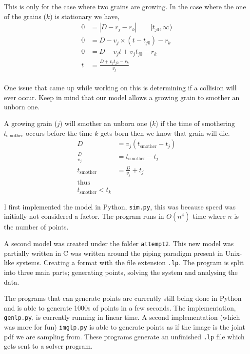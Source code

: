 \documentclass{article}
\begin{document}
This is only for the case where two grains are growing. In the case where the
one of the grains ($k$) is stationary we have,
\begin{align*}
    0 &= |D - r_j - r_k| \qquad [t_{j0}, \infty) \\
    0 &= D - v_j \times (t - t_{j0}) - r_k \\
    0 &= D - v_j t + v_j t_{j0} - r_k \\
    t &= \frac{D + v_j t_{j0} - r_k}{v_j} \\
\end{align*}

One issue that came up while working on this is determining if a collision will
ever occur. Keep in mind that our model allows a growing grain to smother an
unborn one.

A growing grain ($j$) will smother an unborn one ($k$) if the time of
smothering $t_{\text{smother}}$ occurs before the time $k$ gets born
then we know that grain will die.
\begin{align*}
    D &= v_j (t_{\text{smother}} - t_j) \\
    \frac{D}{v_j} &= t_{\text{smother}} - t_j \\
    t_{\text{smother}} &= \frac{D}{v_j} + t_j \\
    \text{thus} \\
    t_{\text{smother}} < t_k
\end{align*}

I first implemented the model in Python, \texttt{sim.py},
this was because speed was initially
not considered a factor. The program runs in $O(n^4)$ time where
$n$ is the number of points.

A second model was created under the folder \texttt{attempt2}. This new model
was partially written in C was written around the piping paradigm
present in Unix-like systems. Creating a format with the file extension
\texttt{.lp}. The program is split into three main parts; generating points,
solving the system and analysing the data.

The programs that
can generate points are currently still being done in Python and
is able to generate 1000s of points in a few seconds. The implementation,
\texttt{genlp.py}, is currently running in linear time. A second implementation
(which was more for fun) \texttt{imglp.py} is able to generate points as if the
image is the joint pdf we are sampling from. These programs generate an
unfinished \texttt{.lp} file which gets sent to a solver program.
\end{document}
